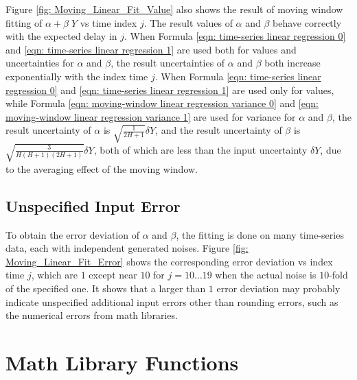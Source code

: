 \documentclass[twoside]{article}
\numberwithin{equation}{section}
\begin{document}
Figure \ref{fig: Moving_Linear_Fit_Value} also shows the result of moving window fitting of $\alpha + \beta\; Y$ vs time index $j$.
The result values of $\alpha$ and $\beta$ behave correctly with the expected delay in $j$.
When Formula \eqref{eqn: time-series linear regression 0} and \eqref{eqn: time-series linear regression 1} are used both for values and uncertainties for $\alpha$ and $\beta$, the result uncertainties of $\alpha$ and $\beta$ both increase exponentially with the index time $j$.
When Formula \eqref{eqn: time-series linear regression 0} and \eqref{eqn: time-series linear regression 1} are used only for values, while Formula \eqref{eqn: moving-window linear regression variance 0} and \eqref{eqn: moving-window linear regression variance 1} are used for variance for $\alpha$ and $\beta$, the result uncertainty of $\alpha$ is $\sqrt{\frac{1}{2H+1}} \delta Y$, and the  result uncertainty of $\beta$ is $\sqrt{\frac{3}{H (H+1)(2H+1)}} \delta Y$, both of which are less than the input uncertainty $\delta Y$, due to the averaging effect of the moving window.


\subsection{Unspecified Input Error}

To obtain the error deviation of $\alpha$ and $\beta$, the fitting is done on many time-series data, each with independent generated noises.
Figure \ref{fig: Moving_Linear_Fit_Error} shows the corresponding error deviation vs index time $j$, which are $1$ except near $10$ for $j = 10 \dots 19$ when the actual noise is $10$-fold of the specified one.
It shows that a larger than $1$ error deviation may probably indicate unspecified additional input errors other than rounding errors, such as the numerical errors from math libraries.




  


\clearpage
\section{Math Library Functions}
\label{sec: Math Library}
\end{document}
